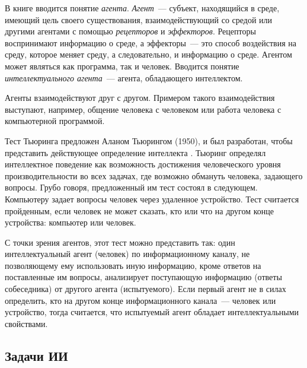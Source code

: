 \documentclass[a4paper,14pt, openany, twoside, draft]{extbook} %
\begin{document}
В книге \cite{Russell} вводится понятие {\em агента}. {\em Агент}~--- субъект, находящийся в среде, имеющий цель своего существования, взаимодействующий со средой или другими агентами с помощью {\em рецепторов} и {\em эффекторов}. Рецепторы воспринимают информацию о среде, а эффекторы~--- это способ воздействия на среду, которое меняет среду, а следовательно, и информацию о среде. Агентом может являться как программа, так и человек. Вводится понятие {\em интеллектуального агента}~--- агента, обладающего интеллектом.

Агенты взаимодействуют друг с другом. Примером такого взаимодействия выступают, например, общение человека с человеком или работа человека с компьютерной программой.

Тест Тьюринга предложен Аланом Тьюрингом (1950), и был разработан, чтобы представить действующее определение интеллекта \cite{Russell}. Тьюринг определял интеллектное поведение как возможность достижения человеческого уровня производительности во всех задачах, где возможно обмануть человека, задающего вопросы. Грубо говоря, предложенный им тест состоял в следующем. Компьютеру задает вопросы человек через удаленное устройство. Тест считается пройденным, если человек не может сказать, кто или что на другом конце устройства: компьютер или человек.

С точки зрения агентов, этот тест можно представить так: один интеллектуальный агент (человек) по информационному каналу, не позволяющему ему использовать иную информацию, кроме ответов на поставленные им вопросы, анализирует поступающую информацию (ответы собеседника) от другого агента (испытуемого). Если первый агент не в силах определить, кто на другом конце информационного канала~--- человек или устройство, тогда считается, что испытуемый агент обладает интеллектуальными свойствами.

\subsection{Задачи ИИ}
\end{document}
